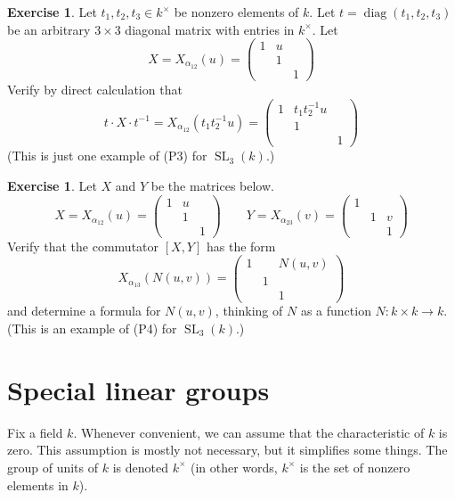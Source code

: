 \documentclass[12pt]{article}
\theoremstyle{definition}
\newtheorem{exercise}[theorem]{Exercise}
\numberwithin{theorem}{subsection}
\newcommand{\inv}{^{-1}}
\DeclareMathOperator{\SL}{SL}
\DeclareMathOperator{\diag}{diag}
\begin{document}
\begin{exercise}
Let $t_1, t_2, t_3 \in k^\times$ be nonzero elements of $k$. Let $t = \diag(t_1, t_2, t_3)$ be an arbitrary $3 \times 3$ diagonal matrix with entries in $k^\times$. Let
\[
	X = X_{\alpha_{12}}(u) = 
	\begin{pmatrix}
		1 & u \\
		& 1 \\
		&& 1
	\end{pmatrix}
\]
Verify by direct calculation that
\[
	t \cdot X \cdot t \inv = X_{\alpha_{12}}(t_1 t_2 \inv u) = 
	\begin{pmatrix}
		1 & t_1 t_2 \inv u \\
		& 1 \\
		&& 1
	\end{pmatrix}
\]
(This is just one example of (P3) for $\SL_3(k)$.)
\end{exercise}

\begin{exercise}
Let $X$ and $Y$ be the matrices below.
\[
	X = X_{\alpha_{12}}(u) = 
	\begin{pmatrix}
		1 & u \\
		& 1 \\
		&& 1
	\end{pmatrix}
	\qquad
	Y = X_{\alpha_{23}}(v) = 
	\begin{pmatrix}
		1 & \\
		& 1 & v \\
		&& 1
	\end{pmatrix}
\]
Verify that the commutator $[X,Y]$ has the form
\[
	X_{\alpha_{13}}( N(u,v) ) = 
	\begin{pmatrix}
		1 & & N(u,v) \\
		& 1 & \\
		&& 1
	\end{pmatrix}
\]
and determine a formula for $N(u,v)$, thinking of $N$ as a function $N:k \times k \to k$. (This is an example of (P4) for $\SL_3(k)$.)
\end{exercise}


\newpage
\section{Special linear groups}
\label{special linear}

Fix a field $k$. Whenever convenient, we can assume that the characteristic of $k$ is zero. This assumption is mostly not necessary, but it simplifies some things. The group of units of $k$ is denoted $k^\times$ (in other words, $k^\times$ is the set of nonzero elements in $k$).
\end{document}
